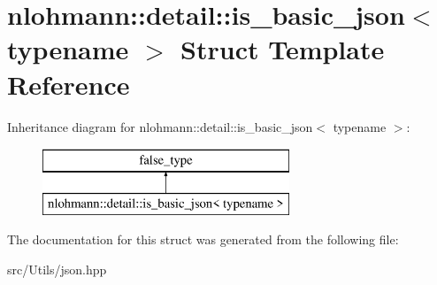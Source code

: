 \hypertarget{structnlohmann_1_1detail_1_1is__basic__json}{}\section{nlohmann\+:\+:detail\+:\+:is\+\_\+basic\+\_\+json$<$ typename $>$ Struct Template Reference}
\label{structnlohmann_1_1detail_1_1is__basic__json}
Inheritance diagram for nlohmann\+:\+:detail\+:\+:is\+\_\+basic\+\_\+json$<$ typename $>$\+:\begin{figure}[H]
\begin{center}
\leavevmode
\includegraphics[height=2.000000cm]{d4/df6/structnlohmann_1_1detail_1_1is__basic__json}
\end{center}
\end{figure}


The documentation for this struct was generated from the following file\+:\begin{DoxyCompactItemize}
\item 
src/\+Utils/json.\+hpp\end{DoxyCompactItemize}
